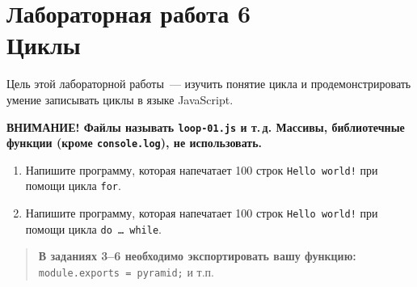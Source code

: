 \documentclass{article}
\begin{document}
\section*{{\normalsize Лабораторная работа 6} \\Циклы}

Цель этой лабораторной работы~--- изучить понятие цикла и продемонстрировать умение записывать циклы в языке JavaScript. 

\bigskip
\noindent\textbf{ВНИМАНИЕ! Файлы называть \texttt{loop-01.js} и т.\,д. Массивы, библиотечные функции (кроме \texttt{console.log}), не использовать.}
\bigskip\sloppy

\begin{enumerate}
\item
Напишите программу, которая напечатает 100 строк \texttt{Hello world!} при помощи цикла \texttt{for}.
\item
Напишите программу, которая напечатает 100 строк \texttt{Hello world!} при помощи цикла \texttt{do \ldots\ while}.
\end{enumerate}



\begin{quotation}
\noindent\centering
\textbf{В заданиях 3--6 необходимо экспортировать вашу функцию:}\\

\texttt{module.exports = pyramid;} и т.п.
\end{quotation}
\end{document}
